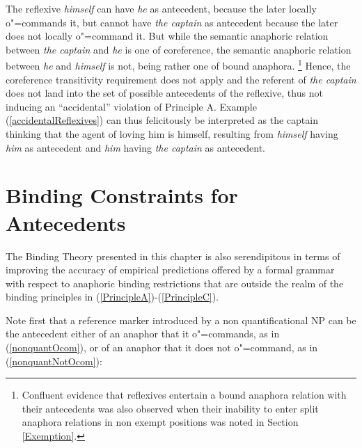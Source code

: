 \documentclass[output=paper
,modfonts
,nonflat]{langsci/langscibook}
\begin{document}
The reflexive {\em himself} can have {\em he} as antecedent, because the later locally
o"=commands it, but cannot have {\em the captain} as antecedent because the later
does not locally o"=command it. But while the semantic anaphoric relation between {\em the captain} 
and {\em he} is one of coreference, the semantic anaphoric relation between {\em he}
and {\em himself} is not, being rather one of bound anaphora.%
\footnote{
Confluent evidence that reflexives entertain a bound anaphora relation with their antecedents
was also observed when their inability to enter split anaphora relations in non exempt positions
was noted in Section \ref{Exemption}.
}
Hence, 
the coreference transitivity requirement does not apply and the referent
of {\em the captain} does not land into the set of possible antecedents
of the reflexive, thus not inducing an ``accidental'' violation of Principle A. Example  (\ref{accidentalReflexives})
can thus felicitously be interpreted as the captain thinking that the agent of loving him is himself,
resulting from {\em himself} having {\em him} as antecedent and {\em him} having {\em the captain} as antecedent.



\section{Binding Constraints for Antecedents \label{reverse}}

The Binding Theory presented in this chapter is also 
serendipitous in terms of improving the accuracy of empirical predictions offered 
by a formal grammar with respect to anaphoric binding restrictions that are outside the
realm of the binding principles in (\ref{PrincipleA})-(\ref{PrincipleC}).

Note first that a reference marker introduced by a non quantificational NP can be 
the antecedent either of an anaphor that it o"=commands, as in  (\ref{nonquantOcom}), or of an anaphor that
it does not o"=command, as in (\ref{nonquantNotOcom}):

\begin{exe}
\ex
\begin{xlist}
 \label{nonquantOcom}
 \label{nonquantOcom}
 \label{nonquantNotOcom}
\end{xlist}
\end{exe}
\end{document}
